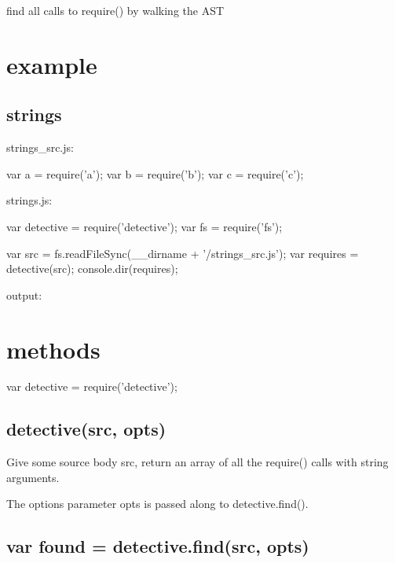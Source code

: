 find all calls to {\ttfamily require()} by walking the A\+ST

\href{http://travis-ci.org/browserify/detective}{\tt }

\section*{example}

\subsection*{strings}

strings\+\_\+src.\+js\+:


\begin{DoxyCode}
var a = require('a');
var b = require('b');
var c = require('c');
\end{DoxyCode}


strings.\+js\+:


\begin{DoxyCode}
var detective = require('detective');
var fs = require('fs');

var src = fs.readFileSync(\_\_dirname + '/strings\_src.js');
var requires = detective(src);
console.dir(requires);
\end{DoxyCode}


output\+:




\section*{methods}


\begin{DoxyCode}
var detective = require('detective');
\end{DoxyCode}


\subsection*{detective(src, opts)}

Give some source body {\ttfamily src}, return an array of all the {\ttfamily require()} calls with string arguments.

The options parameter {\ttfamily opts} is passed along to {\ttfamily detective.\+find()}.

\subsection*{var found = detective.\+find(src, opts)}

